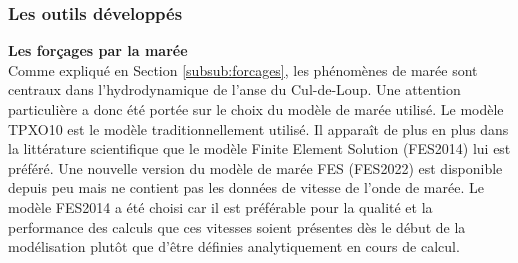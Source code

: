 \documentclass[10pt,a4paper,titlepage]{article}
\begin{document}





\subsubsection{Les outils développés}
\label{subsub:outils_dev}
\textbf{Les forçages par la marée}\\
Comme expliqué en Section \ref{subsub:forcages}, les phénomènes de marée sont centraux dans l'hydrodynamique de l'anse du Cul-de-Loup.
Une attention particulière a donc été portée sur le choix du modèle de marée utilisé.
Le modèle TPXO10 est le modèle traditionnellement utilisé.
Il apparaît de plus en plus dans la littérature scientifique que le modèle Finite Element Solution (FES2014) \parencite{FES2014} lui est préféré.
Une nouvelle version du modèle de marée FES (FES2022) est disponible depuis peu mais ne contient pas les données de vitesse de l'onde de marée.
Le modèle FES2014 a été choisi car il est préférable pour la qualité et la performance des calculs que ces vitesses soient présentes dès le début de la modélisation plutôt que d'être définies analytiquement en cours de calcul.
\end{document}
